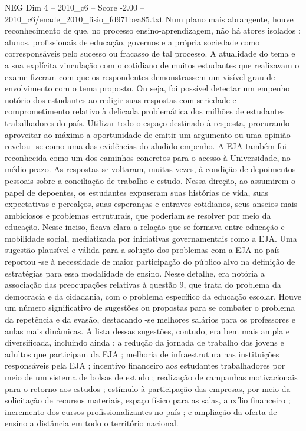 \begin{textsample}{NEG Dim 4 – 2010\_c6 – Score -2.00 – 2010\_c6/enade\_2010\_fisio\_fd971bea85.txt}
Num plano mais abrangente, houve reconhecimento de que, no processo ensino-aprendizagem, não há atores isolados : alunos, profissionais de educação, governos e a própria sociedade como corresponsáveis pelo sucesso ou fracasso de tal processo.
A atualidade do tema e a sua explícita vinculação com o cotidiano de muitos estudantes que realizavam o exame fizeram com que os respondentes demonstrassem um visível grau de envolvimento com o tema proposto.
Ou seja, foi possível detectar um empenho notório dos estudantes ao redigir suas respostas com seriedade e comprometimento relativo à delicada problemática dos milhões de estudantes trabalhadores do país.
Utilizar todo o espaço destinado à resposta, procurando aproveitar ao máximo a oportunidade de emitir um argumento ou uma opinião revelou -se como uma das evidências do aludido empenho.
A EJA também foi reconhecida como um dos caminhos concretos para o acesso à Universidade, no médio prazo.
As respostas se voltaram, muitas vezes, à condição de depoimentos pessoais sobre a conciliação de trabalho e estudo.
Nessa direção, ao assumirem o papel de depoentes, os estudantes expuseram suas histórias de vida, suas expectativas e percalços, suas esperanças e entraves cotidianos, seus anseios mais ambiciosos e problemas estruturais, que poderiam se resolver por meio da educação.
Nesse inciso, ficava clara a relação que se formava entre educação e mobilidade social, mediatizada por iniciativas governamentais como a EJA.
Uma sugestão plausível e válida para a solução dos problemas com a EJA no país reportou -se à necessidade de maior participação do público alvo na definição de estratégias para essa modalidade de ensino.
Nesse detalhe, era notória a associação das preocupações relativas à questão 9, que trata do problema da democracia e da cidadania, com o problema específico da educação escolar.
Houve um número significativo de sugestões ou propostas para se combater o problema da repetência e da evasão, destacando -se melhores salários para os professores e aulas mais dinâmicas.
A lista dessas sugestões, contudo, era bem mais ampla e diversificada, incluindo ainda : a redução da jornada de trabalho dos jovens e adultos que participam da EJA ; melhoria de infraestrutura nas instituições responsáveis pela EJA ; incentivo financeiro aos estudantes trabalhadores por meio de um sistema de bolsas de estudo ; realização de campanhas motivacionais para o retorno aos estudos ; estímulo à participação das empresas, por meio da solicitação de recursos materiais, espaço físico para as salas, auxílio financeiro ; incremento dos cursos profissionalizantes no país ; e ampliação da oferta de ensino a distância em todo o território nacional.

\end{textsample}
